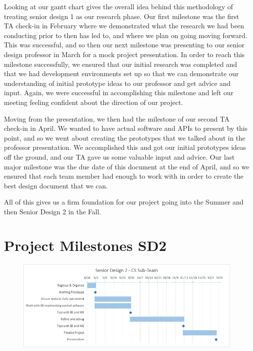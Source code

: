 \documentclass[12pt]{report}
\begin{document}
Looking at our gantt chart gives the overall idea behind this methodology of treating senior design 1 as our research phase. Our first milestone was the first TA check-in in February where we demonstrated what the research we had been conducting prior to then has led to, and where we plan on going moving forward. This was successful, and so then our next milestone was presenting to our senior design professor in March for a mock project presentation. In order to reach this milestone successfully, we ensured that our initial research was completed and that we had development environments set up so that we can demonstrate our understanding of initial prototype ideas to our professor and get advice and input. Again, we were successful in accomplishing this milestone and left our meeting feeling confident about the direction of our project.

Moving from the presentation, we then had the milestone of our second TA check-in in April. We wanted to have actual software and APIs to present by this point, and so we went about creating the prototypes that we talked about in the professor presentation. We accomplished this and got our initial prototypes ideas off the ground, and our TA gave us some valuable input and advice. Our last major milestone was the due date of this document at the end of April, and so we ensured that each team member had enough to work with in order to create the best design document that we can. 

All of this gives us a firm foundation for our project going into the Summer and then Senior Design 2 in the Fall.

\section*{Project Milestones SD2}

\begin{figure}[h]
	\centering
	\includegraphics[width=\linewidth]{SD2Gantt}
\end{figure}
\end{document}
